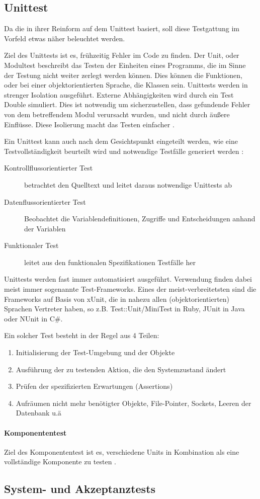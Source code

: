 \subsection{Unittest}
Da die  in ihrer Reinform auf dem Unittest basiert, soll diese Testgattung im Vorfeld etwas näher beleuchtet werden.

Ziel des Unittests ist es, frühzeitig Fehler im Code zu finden. Der Unit, oder Modultest beschreibt das Testen der Einheiten eines Programms, die im Sinne der Testung nicht weiter zerlegt werden können. Dies können die Funktionen, oder bei einer objektorientierten Sprache, die Klassen sein. Unittests werden in strenger Isolation ausgeführt. Externe Abhängigkeiten wird durch ein Test Double simuliert. Dies ist notwendig um sicherzustellen, dass gefundende Fehler von dem betreffendem Modul verursacht wurden, und nicht durch äußere Einflüsse. Diese Isolierung macht das Testen einfacher \citep{goodliffe_code_2006}.

Ein Unittest kann auch nach dem Gesichtspunkt eingeteilt werden, wie eine Testvollständigkeit beurteilt wird und notwendige Testfälle generiert werden \citep{liggesmeyer_modultest_1990}:
\begin{description}
 \item[Kontrollflussorientierter Test] betrachtet den Quelltext und leitet daraus notwendige Unittests ab
 \item[Datenflussorientierter Test] Beobachtet die Variablendefinitionen, Zugriffe und Entscheidungen anhand der Variablen
 \item[Funktionaler Test] leitet aus den funktionalen Spezifikationen Testfälle her
\end{description}

Unittests werden fast immer automatisiert ausgeführt. Verwendung finden dabei meist immer sogenannte Test-Frameworks. Eines der meist-verbreitetsten sind die Frameworks auf Basis von xUnit, die in nahezu allen (objektorientierten) Sprachen Vertreter haben, so z.B. Test::Unit/MiniTest in Ruby, JUnit in Java oder NUnit in C\#.

Ein solcher Test besteht in der Regel aus 4 Teilen:
\begin{enumerate}
 \item Initialisierung der Test-Umgebung und der Objekte
 \item Ausführung der zu testenden Aktion, die den Systemzustand ändert
 \item Prüfen der spezifizierten Erwartungen (Assertions)
 \item Aufräumen nicht mehr benötigter Objekte, File-Pointer, Sockets, Leeren der Datenbank u.ä 
\end{enumerate}

\paragraph{Komponententest}
Ziel des Komponententest ist es, verschiedene Units in Kombination als eine vollständige Komponente zu testen \citep{goodliffe_code_2006}.

\subsection{System- und Akzeptanztests}
